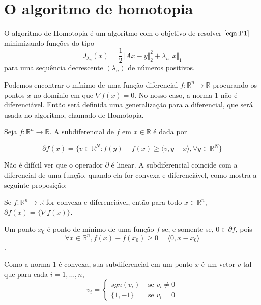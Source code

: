 \chapter{O algoritmo de homotopia}

O algoritmo de Homotopia é um algoritmo com o objetivo de resolver $\eqref{eqn:P1}$ minimizando funções do tipo
$$J_{\lambda_n}(x) = \frac{1}{2} \Vert Ax - y \Vert_2^2 + \lambda_n \Vert x \Vert_1$$
para uma sequência decrescente $(\lambda_n)$ de números positivos.

Podemos encontrar o mínimo de uma função diferencial $f: \mathbb{R}^n \longrightarrow \mathbb{R}$ procurando os pontos $x$ no domínio em que $\nabla f(x) = 0$. No nosso caso, a norma $1$ não é diferenciável. Então será definida uma generalização para a diferencial, que será usada no algoritmo, chamado de Homotopia.

\begin{definicao}
Seja $f: \mathbb{R}^n \longrightarrow \mathbb{R}$. A subdiferencial de $f$ em $x \in \mathbb{R}$ é dada por

$$\partial f(x) = \{ v \in \mathbb{R}^N : f(y) - f(x) \geq \langle v, y - x \rangle, \forall y \in \mathbb{R}^N \}$$

\end{definicao}

Não é difícil ver que o operador $\partial$ é linear. A subdiferencial coincide com a diferencial de uma função, quando ela for convexa e diferenciável, como mostra a seguinte proposição:

\begin{proposicao}
Se $f: \mathbb{R}^n \longrightarrow \mathbb{R}$ for convexa e diferenciável, então para todo $x \in \mathbb{R}^n$, $\partial f(x) = \{ \nabla f(x) \}$.
\end{proposicao}

Um ponto $x_0$ é ponto de mínimo de uma função $f$ se, e somente se, $0 \in \partial f$, pois
$$ \forall x \in \mathbb{R}^n, f(x) - f(x_0) \geq 0 = \langle 0, x - x_0 \rangle$$.

Como a norma $1$ é convexa, sua subdiferencial em um ponto $x$ é um vetor $v$ tal que para cada $i = 1, \hdots, n$,
$$ v_i =
\begin{cases}
	sgn(v_i) & \mbox{ se } v_i \neq 0 \\
	\lbrace 1, -1\rbrace & \mbox{ se } v_i = 0
\end{cases}$$

